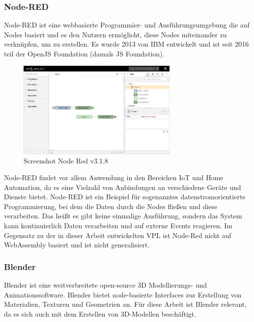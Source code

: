 \documentclass[ngerman]{article}
\begin{document}
\subsubsection{Node-RED}

Node-RED ist eine webbasierte Programmier- und Ausführungsumgebung die auf Nodes basiert und es den Nutzern ermöglicht, diese Nodes miteinander zu verknüpfen, um  zu erstellen. 
Es wurde 2013 von IBM entwickelt und ist seit 2016 teil der OpenJS Foundation (damals JS Foundation).
\cite{nodered}

\begin{figure}[htbp]
  \centering
  \includegraphics[width=0.7\textwidth]{./graphics/node-red-3_1_8.png}
  \caption{Screenshot Node Red v3.1.8}
  \label{fig:node_red}
\end{figure}

Node-RED findet vor allem Anwendung in den Bereichen IoT und Home Automation, da es eine Vielzahl von Anbindungen an verschiedene Geräte und Dienste bietet. 
Node-RED ist ein Beispiel für sogenanntes datenstromorientierte Programmierung, bei dem die Daten durch die Nodes fließen und diese verarbeiten. Das heißt es gibt keine einmalige Ausführung, sondern das System kann kontinuierlich Daten verarbeiten und auf externe Events reagieren. Im Gegensatz zu der in dieser Arbeit entwickelten VPL ist Node-Red nicht auf WebAssembly basiert und ist nicht generalisiert.


\pagebreak
\subsubsection{Blender}
Blender ist eine weitverbreitete open-source 3D Modellierungs- und Animationssoftware. Blender bietet node-basierte Interfaces zur Erstellung von Materialien, Texturen und Geometrien an. 
\cite{blender}
Für diese Arbeit ist Blender relevant, da es sich auch mit dem Erstellen von 3D-Modellen beschäftigt.
\end{document}
